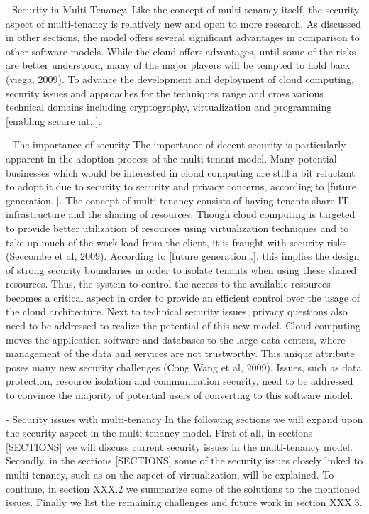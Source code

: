 - Security in Multi-Tenancy.
Like the concept of multi-tenancy itself, the security aspect of multi-tenancy is relatively new and open to more research. As discussed in other sections, the model offers several significant advantages in comparison to other software models. While the cloud offers advantages, until some of the risks are better understood, many of the major players will be tempted to hold back (viega, 2009). To advance the development and deployment of cloud computing, security issues and approaches for the techniques range and cross various technical domains including cryptography, virtualization and programming [enabling secure mt..].

- The importance of security
The importance of decent security is particularly apparent in the adoption process of the multi-tenant model. Many potential businesses which would be interested in cloud computing are still a bit reluctant to adopt it due to security to security and privacy concerns, according to [future generation..]. The concept of multi-tenancy consists of having tenants share IT infrastructure and the sharing of resources. Though cloud computing is targeted to provide better utilization of resources using virtualization techniques and to take up much of the work load from the client, it is fraught with security risks (Seccombe et al, 2009). According to [future generation…], this implies the design of strong security boundaries in order to isolate tenants when using these shared resources. Thus, the system to control the access to the available resources becomes a critical aspect in order to provide an efficient control over the usage of the cloud architecture. 
Next to technical security issues, privacy questions also need to be addressed to realize the potential of this new model. Cloud computing moves the application software and databases to the large data centers, where management of the data and services are not trustworthy. This unique attribute poses many new security challenges (Cong Wang et al, 2009). Issues, such as data protection, resource isolation and communication security, need to be addressed to convince the majority of potential users of converting to this software model.

- Security issues with multi-tenancy
In the following sections we will expand upon the security aspect in the multi-tenancy model. First of all, in sections [SECTIONS] we will discuss current security issues in the multi-tenancy model. 
Secondly, in the sections [SECTIONS] some of the security issues closely linked to multi-tenancy, such as on the aspect of virtualization, will be explained. To continue, in section XXX.2 we summarize some of the solutions to the mentioned issues. Finally we list the remaining challenges and future work in section XXX.3.

